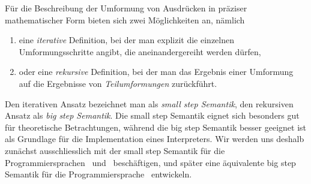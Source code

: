 F\"ur die Beschreibung der Umformung von Ausdr\"ucken in pr\"aziser mathematischer Form bieten
sich zwei M\"oglichkeiten an, n\"amlich
\begin{enumerate}
  \item eine {\em iterative} Definition, bei der man explizit die einzelnen Umformungsschritte
        angibt, die aneinandergereiht werden d\"urfen,
  \item oder eine {\em rekursive} Definition, bei der man das Ergebnis einer Umformung auf
        die Ergebnisse von {\em Teilumformungen} zur\"uckf\"uhrt.
\end{enumerate}
Den iterativen Ansatz bezeichnet man als {\em small step Semantik},
den rekursiven Ansatz als {\em big step Semantik}. Die small step
Semantik eignet sich besonders gut f\"ur theoretische Betrachtungen, w\"ahrend die big step
Semantik besser geeignet ist als Grundlage f\"ur die Implementation eines Interpreters. Wir
werden uns deshalb zun\"achst ausschliesslich mit der small step Semantik f\"ur die
Programmiersprachen \Lf\ und \Lo\ besch\"aftigen, und sp\"ater eine \"aquivalente big step
Semantik f\"ur die Programmiersprache \Lo\ entwickeln.

